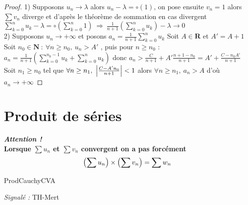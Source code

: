 		\begin{proof}
			{\small 1)} Supposons $u_n \to \lambda$ alors $u_n - \lambda = \circ (1)$, on pose ensuite $v_n = 1$ alors $\sum v_n$ diverge 
			et d'après le théorème de sommation en cas divergent \\ $\sum_{k=0}^{n} u_k - \lambda = \circ ( \sum_{k=0}^{n} 1 ) ~
			\Rightarrow ~\frac{1}{n+1} ( \sum_{k=0}^{n} u_k ) - \lambda \to 0$ \\
			{\small 2)} Supposons $u_n \to +\infty$ et posons $a_n = \frac{1}{n+1} \sum_{k=0}^{n} u_k$
			Soit $A\in\mathbf{R}$ et $A'=A+1$ \\ Soit $n_0 \in\mathbf{N} ~:~\forall n\geq n_0 ,~u_n >A'$ , puis pour $n\geq n_0$ :\\
			$a_n = \frac{1}{n+1} ( \sum_{k=0}^{n_0-1} u_k + \sum_{k=0}^{n} u_k )$ 
			donc $a_n > \frac{C}{n+1} + A'\frac{n+1-n_0}{n+1} = A' + \frac{C-n_0A'}{n+1}$ \\ 
			Soit $n_1\geq n_0$ tel que $\forall n\geq n_1 ,~\left\vert \frac{C-A'n_0}{n+1} \right\vert <1$ alors $\forall n\geq n_1 ,~a_n > A$ d'où $a_n \to +\infty$
		\end{proof}
	
	
\section{Produit de séries}
		

		\textbf{\emph{Attention !} \\Lorsque $\sum u_n$ et $\sum v_n$ convergent on a pas forcément}
		\[
			\left(\sum u_n \right) \times \left(\sum v_n \right) = \sum w_n \medskip
		\] 
		
		{ProdCauchyCVA}

		\textit{\small Signalé :}
		{TH-Mert}
		
